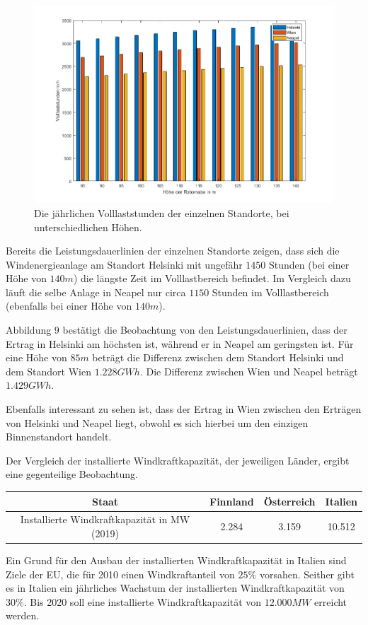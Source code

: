 \documentclass[a4paper,12pt]{article}
\begin{document}
	\begin{figure}[H]
		\centering
		\includegraphics[width=12cm]{img/results/VolllaststundenEuropa}
		\caption{Die jährlichen Volllaststunden der einzelnen Standorte, bei unterschiedlichen Höhen.}
	\end{figure}
	\noindent Bereits die Leistungsdauerlinien der einzelnen Standorte zeigen, dass sich die Windenergieanlage am Standort Helsinki mit ungefähr $1450$ Stunden (bei einer Höhe von $140m$) die längste Zeit im Volllastbereich befindet. Im Vergleich dazu läuft die selbe Anlage in Neapel nur circa $1150$ Stunden im Volllastbereich (ebenfalls bei einer Höhe von $140m$).\\ \par
	\noindent Abbildung 9 bestätigt die Beobachtung von den Leistungsdauerlinien, dass der Ertrag in Helsinki am höchsten ist, während er in Neapel am geringsten ist.\newline
	Für eine Höhe von $85m$ beträgt die Differenz zwischen dem Standort Helsinki und dem Standort Wien $1.228GWh$. Die Differenz zwischen Wien und Neapel beträgt $1.429GWh$.\\ \par
	\noindent Ebenfalls interessant zu sehen ist, dass der Ertrag in Wien zwischen den Erträgen von Helsinki und Neapel liegt, obwohl es sich hierbei um den einzigen Binnenstandort handelt.\\ \par
	\noindent Der Vergleich der installierte Windkraftkapazität, der jeweiligen Länder, ergibt eine gegenteilige Beobachtung.
	\begin{table}[H]
		\centering
		\begin{tabular}{|c|c|c|c|}
			\hline
			Staat                                        & Finnland & Österreich & Italien \\ \hline
			Installierte Windkraftkapazität in MW (2019) & 2.284    & 3.159      & 10.512  \\ \hline
		\end{tabular}
	\end{table}
	\noindent Ein Grund für den Ausbau der installierten Windkraftkapazität in Italien sind Ziele der EU, die für 2010 einen Windkraftanteil von $25\%$ vorsahen. Seither gibt es in Italien ein jährliches Wachstum der installierten Windkraftkapazität von $30\%$. Bis 2020 soll eine installierte Windkraftkapazität von $12.000MW$ erreicht werden.
\end{document}

